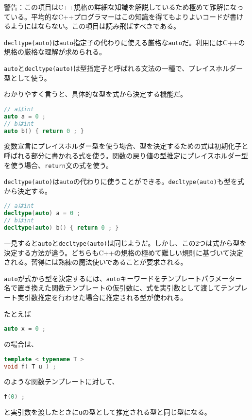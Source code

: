 %

\noindent
\textsf{警告}：この項目はC++規格の詳細な知識を解説しているため極めて難解になっている。平均的なC++プログラマーはこの知識を得てもよりよいコードが書けるようにはならない。この項目は読み飛ばすべきである。

\lstinline!decltype(auto)!は\lstinline!auto!指定子の代わりに使える厳格な\lstinline!auto!だ。利用にはC++の規格の厳格な理解が求められる。

\lstinline!auto!と\lstinline!decltype(auto)!は型指定子と呼ばれる文法の一種で、プレイスホルダー型として使う。

わかりやすく言うと、具体的な型を式から決定する機能だ。

\begin{lstlisting}[language=C++]
// aはint
auto a = 0 ;
// bはint 
auto b() { return 0 ; } 
\end{lstlisting}

変数宣言にプレイスホルダー型を使う場合、型を決定するための式は初期化子と呼ばれる部分に書かれる式を使う。関数の戻り値の型推定にプレイスホルダー型を使う場合、\lstinline!return!文の式を使う。

\lstinline!decltype(auto)!は\lstinline!auto!の代わりに使うことができる。\lstinline!decltype(auto)!も型を式から決定する。

\begin{lstlisting}[language=C++]
// aはint
decltype(auto) a = 0 ;
// bはint
decltype(auto) b() { return 0 ; }
\end{lstlisting}

一見すると\lstinline!auto!と\lstinline!decltype(auto)!は同じようだ。しかし、この2つは式から型を決定する方法が違う。どちらもC++の規格の極めて難しい規則に基づいて決定される。習得には熟練の魔法使いであることが要求される。

\lstinline!auto!が式から型を決定するには、\lstinline!auto!キーワードをテンプレートパラメーター名で置き換えた関数テンプレートの仮引数に、式を実引数として渡してテンプレート実引数推定を行わせた場合に推定される型が使われる。

たとえば
\begin{lstlisting}[language=C++]
auto x = 0 ;
\end{lstlisting}
の場合は、
\begin{lstlisting}[language=C++]
template < typename T >
void f( T u ) ;
\end{lstlisting}
のような関数テンプレートに対して、
\begin{lstlisting}[language=C++]
f(0) ;
\end{lstlisting}
と実引数を渡したときに\lstinline!u!の型として推定される型と同じ型になる。

